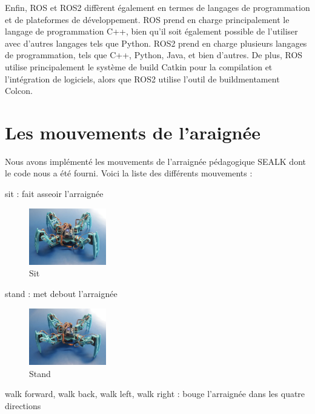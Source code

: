 Enfin, ROS et ROS2 diffèrent également en termes de langages de programmation et de plateformes de développement. 
ROS prend en charge principalement le langage de programmation C++, bien qu'il soit également possible de l'utiliser avec d'autres 
langages tels que Python. ROS2 prend en charge plusieurs langages de programmation, tels que C++, Python, Java, et bien d'autres. 
De plus, ROS utilise principalement le système de build Catkin pour la compilation et l'intégration de logiciels, alors que 
ROS2 utilise l'outil de buildmentament Colcon. 

		\section{Les mouvements de l'araignée}
		\label{les_mouvements}

Nous avons implémenté les mouvements de l'arraignée pédagogique SEALK dont le code nous a été fourni. Voici la liste des différents mouvements :	

sit : fait asseoir l'arraignée

\begin{figure}
	\begin{center}
		\includegraphics[width=0.3\textwidth]{./img/sit}
		\caption{Sit}
	\end{center}
\end{figure}

stand : met debout l'arraignée

\begin{figure}
	\begin{center}
		\includegraphics[width=0.3\textwidth]{./img/stand}
		\caption{Stand}
	\end{center}
\end{figure}

walk forward, walk back, walk left, walk right : bouge l'arraignée dans les quatre directions

